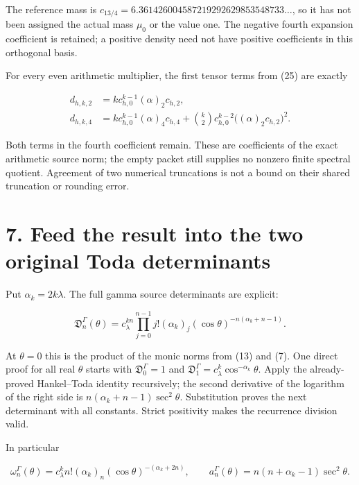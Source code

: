 \documentclass[
  11pt,
]{article}
\begin{document}
The reference mass is
\(c_{13/4}=6.361426004587219292629853548733\ldots\), so it has not been
assigned the actual mass \(\mu_0\) or the value one. The negative fourth
expansion coefficient is retained; a positive density need not have
positive coefficients in this orthogonal basis.

For every even arithmetic multiplier, the first tensor terms from (25)
are exactly

\[
\begin{aligned}
d_{h,k,2}&=k c_{h,0}^{k-1}(\alpha)_2c_{h,2},\\
d_{h,k,4}&=k c_{h,0}^{k-1}(\alpha)_4c_{h,4}
 +\binom{k}{2}c_{h,0}^{k-2}\bigl((\alpha)_2c_{h,2}\bigr)^2.
\end{aligned}
\]

Both terms in the fourth coefficient remain. These are coefficients of
the exact arithmetic source norm; the empty packet still supplies no
nonzero finite spectral quotient. Agreement of two numerical truncations
is not a bound on their shared truncation or rounding error.

\section{7. Feed the result into the two original Toda
determinants}\label{feed-the-result-into-the-two-original-toda-determinants}

Put \(\alpha_k=2k\lambda\). The full gamma source determinants are
explicit:

\[
\boxed{
\mathfrak D_n^\Gamma(\theta)
=c_\lambda^{kn}
\prod_{j=0}^{n-1}j!(\alpha_k)_j
(\cos\theta)^{-n(\alpha_k+n-1)}.
}                                                                   \tag{28}
\]

At \(\theta=0\) this is the product of the monic norms from (13) and
(7). One direct proof for all real \(\theta\) starts with
\(\mathfrak D_0^\Gamma=1\) and
\(\mathfrak D_1^\Gamma=c_\lambda^k\cos^{-\alpha_k}\theta\). Apply the
already-proved Hankel--Toda identity recursively; the second derivative
of the logarithm of the right side is \(n(\alpha_k+n-1)\sec^2\theta\).
Substitution proves the next determinant with all constants. Strict
positivity makes the recurrence division valid.

In particular

\[
\omega_n^\Gamma(\theta)
=c_\lambda^k n!(\alpha_k)_n(\cos\theta)^{-(\alpha_k+2n)},\qquad
 a_n^\Gamma(\theta)=n(n+\alpha_k-1)\sec^2\theta.                     \tag{29}
\]
\end{document}
